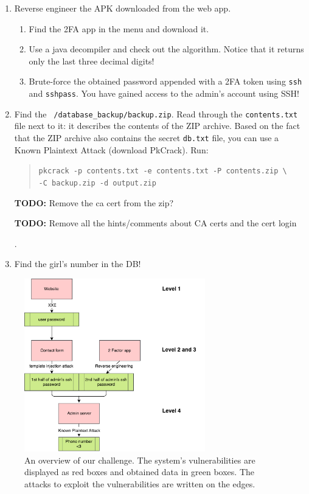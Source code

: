 \documentclass[a4paper]{article}
\newcommand{\TODO}[1]{\begin{center}\large\textbf{TODO:} #1\end{center}}
\begin{document}
\begin{enumerate}
  \item Reverse engineer the APK downloaded from the web app.
        \begin{enumerate}
          \item Find the 2FA app in the menu and download it.
          \item Use a java decompiler and check out the algorithm.
              Notice that it returns only the last three decimal digits!
          \item Brute-force the obtained password appended with a 2FA token
              using \texttt{ssh} and \texttt{sshpass}.
              You have gained access to the admin's account using SSH!
        \end{enumerate}

  \item Find the \texttt{~/database\_backup/backup.zip}. Read through the \texttt{contents.txt} file next to it:
          it describes the contents of the ZIP archive. Based on the fact that the ZIP archive
          also contains the secret \texttt{db.txt} file, you can use a Known Plaintext
        Attack (download PkCrack). Run:
        \begin{quote}
            \texttt{pkcrack -p contents.txt -e contents.txt -P contents.zip \textbackslash}\\
            \texttt{-C backup.zip -d output.zip}\\
        \end{quote}
        \TODO{Remove the ca cert from the zip?}
        \TODO{Remove all the hints/comments about CA certs and the cert login}.

  \item Find the girl's number in the DB!

\end{enumerate}

\begin{figure}
    \begin{center}
    \includegraphics[width=0.7\textwidth]{images/diagram}
    \end{center}
    \caption{An overview of our challenge. The system's vulnerabilities
    are displayed as red boxes and obtained data in green boxes. The attacks
    to exploit the vulnerabilities are written on the edges.}
    \label{fig:diag}
\end{figure}
\end{document}
